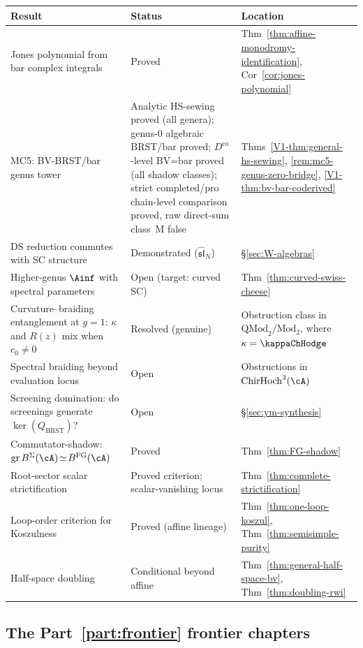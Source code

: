 \begin{center}
\small
\renewcommand{\arraystretch}{1.3}
\begin{tabular}{@{}p{4.2cm}p{5.4cm}p{3.2cm}@{}}
\textbf{Result} & \textbf{Status} & \textbf{Location} \\
\hline
Jones polynomial from bar complex integrals
 & Proved
 & Thm~\ref{thm:affine-monodromy-identification},
 Cor~\ref{cor:jones-polynomial} \\
MC5: BV-BRST/bar genus tower
 & Analytic HS-sewing proved (all genera); genus-$0$ algebraic BRST/bar proved; $D^{\mathrm{co}}$-level BV=bar proved (all shadow classes); strict completed/pro chain-level comparison proved, raw direct-sum class~M false
 & Thms~\ref*{V1-thm:general-hs-sewing},
 \ref{rem:mc5-genus-zero-bridge},
 \ref{V1-thm:bv-bar-coderived} \\
DS reduction commutes with SC structure
 & Demonstrated ($\widehat{\mathfrak{sl}}_N$)
 & \S\ref{sec:W-algebras} \\
Higher-genus $\Ainf$ with spectral parameters
 & Open (target: curved SC)
 & Thm~\ref{thm:curved-swiss-cheese} \\
Curvature--braiding entanglement at $g{=}1$:
 $\kappa$ and $R(z)$ mix when $c_0\!\neq\!0$
 & Resolved (genuine)
 & Obstruction class in
 $\mathrm{QMod}_2/\mathrm{Mod}_2$, where
 $\kappa = \kappaChHodge$ \\
Spectral braiding beyond evaluation locus
 & Open
 & Obstructions in
 $\mathrm{ChirHoch}^3(\cA)$ \\
Screening domination: do screenings
 generate $\ker(Q_{\mathrm{BRST}})$?
 & Open
 & \S\ref*{sec:ym-synthesis} \\
Commutator-shadow: $\mathrm{gr}\,B^{\Sigma}(\cA) \!\simeq\! B^{\mathrm{FG}}(\cA)$
 & Proved
 & Thm~\ref{thm:FG-shadow} \\
Root-sector scalar strictification
 & Proved criterion; scalar-vanishing locus
 & Thm~\ref{thm:complete-strictification} \\
Loop-order criterion for Koszulness
 & Proved (affine lineage)
 & Thm~\ref{thm:one-loop-koszul},
 Thm~\ref{thm:semisimple-purity} \\
Half-space doubling
 & Conditional beyond affine
 & Thm~\ref{thm:general-half-space-bv},
 Thm~\ref{thm:doubling-rwi} \\
\end{tabular}
\end{center}

\subsection{The Part~\ref{part:frontier} frontier chapters}
\label{subsec:frontier-chapters}

